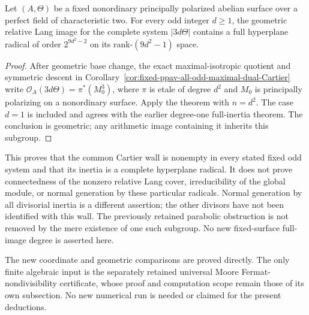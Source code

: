 \begin{corollary}
\label{cor:fixed-ppav-odd-full-hyperplane-inertia}
Let \((A,\Theta)\) be a fixed nonordinary principally polarized
abelian surface over a perfect field of characteristic two.
For every odd integer \(d\ge1\), the geometric relative Lang image
for the complete system \(|3d\Theta|\) contains a full hyperplane
radical of order \(2^{9d^2-2}\) on its rank-\((9d^2-1)\) space.
\end{corollary}
\begin{proof}
After geometric base change, the exact maximal-isotropic quotient
and symmetric descent in
Corollary~\ref{cor:fixed-ppav-all-odd-maximal-dual-Cartier}
write \(\mathcal O_A(3d\Theta)=\pi^*(M_0^3)\), where \(\pi\)
is etale of degree \(d^2\) and \(M_0\) is principally polarizing
on a nonordinary surface.  Apply the theorem with \(n=d^2\).
The case \(d=1\) is included and agrees with the earlier
degree-one full-inertia theorem.  The conclusion is geometric;
any arithmetic image containing it inherits this subgroup.
\end{proof}

\begin{remark}
\label{rem:odd-full-hyperplane-inertia-scope}
This proves that the common Cartier wall is nonempty in every
stated fixed odd system and that its inertia is a complete
hyperplane radical.  It does not prove connectedness of the
nonzero relative Lang cover, irreducibility of the global module,
or normal generation by these particular radicals.  Normal
generation by all divisorial inertia is a different assertion;
the other divisors have not been identified with this wall.
The previously retained parabolic obstruction is not removed by
the mere existence of one such subgroup.  No new fixed-surface
full-image degree is asserted here.

The new coordinate and geometric comparisons are proved directly.
The only finite algebraic input is the separately retained universal
Moore Fermat-nondivisibility certificate, whose proof and computation
scope remain those of its own subsection.  No new numerical run
is needed or claimed for the present deductions.
\end{remark}
